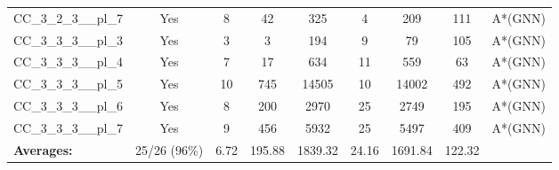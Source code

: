 \documentclass{article}
\begin{document}
\begin{tabular}{lcccccccc}
CC\_3\_2\_3\_\_pl\_7 & Yes & 8 & 42 & 325 & 4 & 209 & 111 & A*(GNN) \\
CC\_3\_3\_3\_\_pl\_3 & Yes & 3 & 3 & 194 & 9 & 79 & 105 & A*(GNN) \\
CC\_3\_3\_3\_\_pl\_4 & Yes & 7 & 17 & 634 & 11 & 559 & 63 & A*(GNN) \\
CC\_3\_3\_3\_\_pl\_5 & Yes & 10 & 745 & 14505 & 10 & 14002 & 492 & A*(GNN) \\
CC\_3\_3\_3\_\_pl\_6 & Yes & 8 & 200 & 2970 & 25 & 2749 & 195 & A*(GNN) \\
CC\_3\_3\_3\_\_pl\_7 & Yes & 9 & 456 & 5932 & 25 & 5497 & 409 & A*(GNN) \\
\textbf{Averages:} & 25/26 (96\%) & 6.72 & 195.88 & 1839.32 & 24.16 & 1691.84 & 122.32 & \\
\bottomrule
\end{tabular}
\\[0.7cm]
\end{document}
